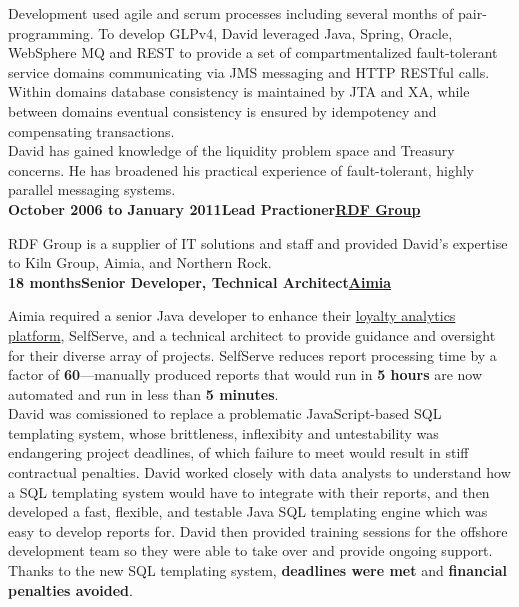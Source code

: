 \documentclass[a4paper,12pt]{article}
\newcommand{\clientwork}[3]{\textbf{#1\hfill#3\hfill#2}\nopagebreak}
\begin{document}
Development used agile and scrum processes including several months of pair-programming. To develop GLPv4, David leveraged Java, Spring, Oracle, WebSphere MQ and REST to provide a set of compartmentalized fault-tolerant service domains communicating via JMS messaging and HTTP RESTful calls. Within domains database consistency is maintained by JTA and XA, while between domains eventual consistency is ensured by idempotency and compensating transactions.\\

David has gained knowledge of the liquidity problem space and Treasury concerns. He has broadened his practical experience of fault-tolerant, highly parallel messaging systems.\\

\clientwork{October 2006 to January 2011}{\href{http://www.rdfgroup.com/}{RDF Group}}{Lead Practioner}

RDF Group is a supplier of IT solutions and staff and provided David's expertise to Kiln Group, Aimia, and Northern Rock.\\

\clientwork{18 months}{\href{http://www.aimia.com/}{Aimia}}{Senior Developer, Technical Architect}

Aimia required a senior Java developer to enhance their \href{http://www.aimia.com/English/Services/Loyalty-Analytics/default.aspx}{loyalty analytics platform}, SelfServe, and a technical architect to provide guidance and oversight for their diverse array of projects. SelfServe reduces report processing time by a factor of \textbf{60}---manually produced reports that would run in \textbf{5 hours} are now automated and run in less than \textbf{5 minutes}.\\

David was comissioned to replace a problematic JavaScript-based SQL templating system, whose brittleness, inflexibity and untestability was endangering project deadlines, of which failure to meet would result in stiff contractual penalties. David worked closely with data analysts to understand how a SQL templating system would have to integrate with their reports, and then developed a fast, flexible, and testable Java SQL templating engine which was easy to develop reports for. David then provided training sessions for the offshore development team so they were able to take over and provide ongoing support. Thanks to the new SQL templating system, \textbf{deadlines were met} and \textbf{financial penalties avoided}. \\
\end{document}
